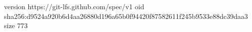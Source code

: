 version https://git-lfs.github.com/spec/v1
oid sha256:d9524a920b6d4aa26880d196a65b0f94420f87582611f245b9533e88dc39daa3
size 773
